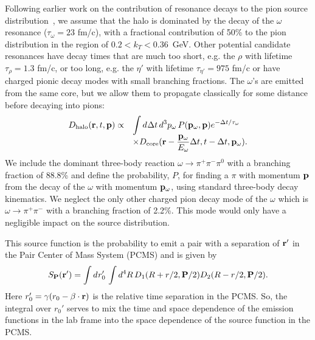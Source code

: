 \documentclass[aps,prl,twocolumn,floatfix,preprintnumbers,showpacs]{revtex4}
\newcommand{\dn}[2]{d^{#1}{#2}\,}
\begin{document}
Following earlier work on the contribution of resonance decays to the pion source distribution~\cite{Wiedemann:1996ig,Sullivan93}, we assume that the halo is dominated by the decay of the $\omega$ resonance ($\tau_\omega = 23$ fm/c), with a fractional contribution of 50\% to the pion distribution in the region of $0.2<k_T<0.36$~GeV. Other potential candidate resonances have decay times that are much too short, e.g. the $\rho$ with lifetime $\tau_\rho = 1.3$ fm/c, or too long, e.g. the $\eta'$ with lifetime $\tau_{\eta'} = 975$ fm/c or have charged pionic decay modes with small branching fractions.  The $\omega$'s are emitted from the same core, but we allow them to propagate classically for some distance before decaying into pions:
\begin{equation}
\begin{array}{rl}
    D_{\rm halo}({\bf r}, t, {\bf p}) \propto &\displaystyle\int \dn{}{\Delta t} \dn{3}{p_\omega} P({\bf p}_\omega, {\bf
p}) e^{-\Delta t/\tau_{\omega}} \\
&\displaystyle \times D_{\rm core}({\bf r}-\frac{{\bf p}_\omega}{E_\omega}\Delta t, t-\Delta t, {\bf p_\omega}).
\end{array}
\end{equation}
We include the dominant three-body reaction $\omega\rightarrow\pi^+\pi^-\pi^0$ with a branching fraction of 88.8\% and define the probability, $P$, for finding a $\pi$ with momentum ${\bf p}$ from the decay of the $\omega$ with momentum ${\bf p_\omega}$, using standard three-body decay kinematics.   We neglect the only other charged pion decay mode of the $\omega$ which is $\omega\rightarrow\pi^+\pi^-$ with a branching fraction of 2.2\%.  This mode would only have a negligible impact on the source distribution.

This source function is the probability to emit a pair with a separation of ${\bf r}'$ in the Pair Center of Mass System (PCMS) and is given by~\cite{imag1}
\begin{equation}
   S_{\bf P}({\bf r'})=\int \dn{}{r_0'} \int \dn{4}{R} D_1(R+r/2,{\bf P}/2) D_2(R-r/2,{\bf P}/2).
\label{eqn:sou-def}
\end{equation}
Here $r_{0}' = \gamma(r_{0}-\boldmath{\beta}\cdot{\bf r})$ is the relative time separation in the PCMS.  So, the integral over $r_{0}'$ serves to mix the time and space dependence of the emission functions in the lab frame into the space dependence of the source function in the PCMS.    
\end{document}
